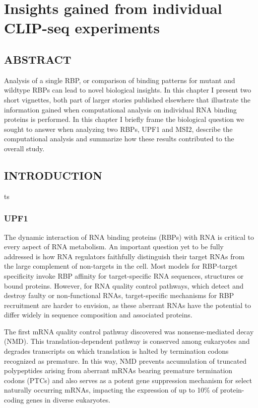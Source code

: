\chapter{Insights gained from individual CLIP-seq experiments}

\section{ABSTRACT}
Analysis of a single RBP, or comparison of binding patterns for mutant and wildtype RBPs can lead to novel biological insights.  In this chapter I present two short vignettes, both part of larger stories published elsewhere that illustrate the information gained when computational analysis on individual RNA binding proteins is performed.  In this chapter I briefly frame the biological question we sought to answer when analyzing two RBPs, UPF1 and MSI2, describe the computational analysis and summarize how these results contributed to the overall study.  
 
\section{INTRODUCTION}
ts\subsection{UPF1}
The dynamic interaction of RNA binding proteins (RBPs) with RNA is critical to every aspect of RNA metabolism\cite{Moore2005}. An important question yet to be fully addressed is how RNA regulators faithfully distinguish their target RNAs from the large complement of non-targets in the cell. Most models for RBP-target specificity invoke RBP affinity for target-specific RNA sequences, structures or bound proteins\cite{Anko2012, Glisovic2008}. However, for RNA quality control pathways, which detect and destroy faulty or non-functional RNAs, target-specific mechanisms for RBP recruitment are harder to envision, as these aberrant RNAs have the potential to differ widely in sequence composition and associated proteins\cite{VanHoof2011,Porrua2013}.

The first mRNA quality control pathway discovered was nonsense-mediated decay (NMD)\cite{Leeds1991, Losson1979, Maquat1981, Pulak1993}. This translation-dependent pathway is conserved among eukaryotes and degrades transcripts on which translation is halted by termination codons recognized as premature. In this way, NMD prevents accumulation of truncated polypeptides arising from aberrant mRNAs bearing premature termination codons (PTCs) and also serves as a potent gene suppression mechanism for select naturally occurring mRNAs, impacting the expression of up to 10\% of protein-coding genes in diverse eukaryotes\cite{Schweingruber2013}.

